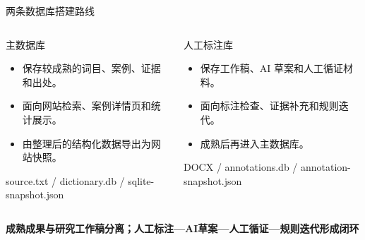 \documentclass[aspectratio=169]{beamer}
\newcommand{\key}[1]{\textcolor{rucRed}{\textbf{#1}}}
\begin{document}
\begin{frame}{两条数据库搭建路线}
    \begin{columns}[T]
            \begin{exampleblock}{主数据库}
                \begin{itemize}
                    \item 保存较成熟的词目、案例、证据和出处。
                    \item 面向网站检索、案例详情页和统计展示。
                    \item 由整理后的结构化数据导出为网站快照。
                \end{itemize}
                \vspace{0.12cm}
                \centering
                {\scriptsize source.txt / dictionary.db / sqlite-snapshot.json}
            \end{exampleblock}
            \begin{exampleblock}{人工标注库}
                \begin{itemize}
                    \item 保存工作稿、AI 草案和人工循证材料。
                    \item 面向标注检查、证据补充和规则迭代。
                    \item 成熟后再进入主数据库。
                \end{itemize}
                \vspace{0.12cm}
                \centering
                {\scriptsize DOCX / annotations.db / annotation-snapshot.json}
            \end{exampleblock}
    \end{columns}
    \vspace{0.25cm}
    \begin{center}
        \key{成熟成果与研究工作稿分离；人工标注—AI草案—人工循证—规则迭代形成闭环}
    \end{center}
\end{frame}
\end{document}
